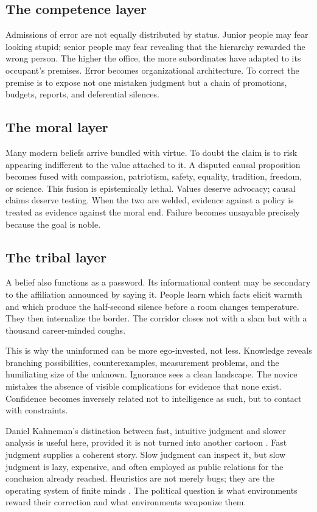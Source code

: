 ﻿\documentclass[12pt,a4paper]{book}
\begin{document}
\subsection{The competence layer}

Admissions of error are not equally distributed by status. Junior people may fear looking stupid; senior people may fear revealing that the hierarchy rewarded the wrong person. The higher the office, the more subordinates have adapted to its occupant's premises. Error becomes organizational architecture. To correct the premise is to expose not one mistaken judgment but a chain of promotions, budgets, reports, and deferential silences.

\subsection{The moral layer}

Many modern beliefs arrive bundled with virtue. To doubt the claim is to risk appearing indifferent to the value attached to it. A disputed causal proposition becomes fused with compassion, patriotism, safety, equality, tradition, freedom, or science. This fusion is epistemically lethal. Values deserve advocacy; causal claims deserve testing. When the two are welded, evidence against a policy is treated as evidence against the moral end. Failure becomes unsayable precisely because the goal is noble.

\subsection{The tribal layer}

A belief also functions as a password. Its informational content may be secondary to the affiliation announced by saying it. People learn which facts elicit warmth and which produce the half-second silence before a room changes temperature. They then internalize the border. The corridor closes not with a slam but with a thousand career-minded coughs.

This is why the uninformed can be more ego-invested, not less. Knowledge reveals branching possibilities, counterexamples, measurement problems, and the humiliating size of the unknown. Ignorance sees a clean landscape. The novice mistakes the absence of visible complications for evidence that none exist. Confidence becomes inversely related not to intelligence as such, but to contact with constraints.

Daniel Kahneman's distinction between fast, intuitive judgment and slower analysis is useful here, provided it is not turned into another cartoon \cite{kahneman2011thinking}. Fast judgment supplies a coherent story. Slow judgment can inspect it, but slow judgment is lazy, expensive, and often employed as public relations for the conclusion already reached. Heuristics are not merely bugs; they are the operating system of finite minds \cite{Tversky1974}. The political question is what environments reward their correction and what environments weaponize them.
\end{document}
